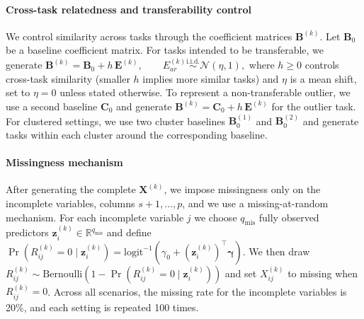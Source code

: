 \documentclass[12pt]{article}
\begin{document}
\paragraph{Cross-task relatedness and transferability control}
We control similarity across tasks through the coefficient matrices $\bm{B}^{(k)}$. Let $\bm{B}_0$ be a baseline coefficient matrix. For tasks intended to be transferable, we generate 
\(\bm{B}^{(k)}=\bm{B}_0+h\,\bm{E}^{(k)},\qquad E^{(k)}_{ar}\stackrel{\text{i.i.d.}}{\sim}\mathcal{N}(\eta,1),\)
where $h\ge 0$ controls cross-task similarity (smaller $h$ implies more similar tasks) and $\eta$ is a mean shift, set to $\eta=0$ unless stated otherwise. To represent a non-transferable outlier, we use a second baseline $\bm{C}_0$ and generate $\bm{B}^{(k)}=\bm{C}_0+h\,\bm{E}^{(k)}$ for the outlier task. For clustered settings, we use two cluster baselines $\bm{B}^{(1)}_0$ and $\bm{B}^{(2)}_0$ and generate tasks within each cluster around the corresponding baseline.

\paragraph{Missingness mechanism}
After generating the complete $\bm{X}^{(k)}$, we impose missingness only on the incomplete variables, columns $s+1,\dots,p$, and we use a missing-at-random mechanism. For each incomplete variable $j$ we choose $q_{\mathrm{mis}}$ fully observed predictors $\bm{z}^{(k)}_i\in\mathbb{R}^{q_{\mathrm{mis}}}$ and define
\(\Pr\!\left(R^{(k)}_{ij}=0 \mid \bm{z}^{(k)}_{i}\right)
=\mathrm{logit}^{-1}\!\left(\gamma_0 + (\bm{z}^{(k)}_{i})^\top\bm{\gamma}\right).
\)
We then draw $R^{(k)}_{ij}\sim\mathrm{Bernoulli}(1-\Pr(R^{(k)}_{ij}=0\mid \bm{z}^{(k)}_{i}))$ and set $X^{(k)}_{ij}$ to missing when $R^{(k)}_{ij}=0$. Across all scenarios, the missing rate for the incomplete variables is 20\%, and each setting is repeated 100 times.
\end{document}
